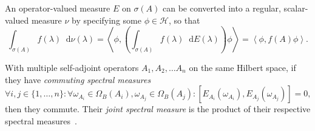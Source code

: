 \documentclass[10pt, a4paper]{article}
\numberwithin{equation}{section} %
\theoremstyle{definition}
\theoremstyle{plain}
\newcommand{\dif}{\mathop{}\!\mathrm{d}} %
\newcommand{\dintv}[2]{\mathopen\{#1,\ldots,#2\mathclose\}}
\newcommand{\?}{\mathrel{?}} %
\newcommand{\angleb}[1]{\left\langle #1 \right\rangle} %
\newcommand{\Hs}{\mathcal{H}} %
\begin{document}
\begin{appendices}
                          An operator-valued measure \(E\) on \(\sigma(A)\) can be converted into a regular, scalar-valued measure \(\nu\) by specifying some \(\phi \in \Hs\), so that
                          \begin{equation} \int_{\sigma(A)} f(\lambda) \dif{\nu(\lambda)} = \angleb{\phi, \left(\int_{\sigma(A)} f(\lambda) \dif{E(\lambda)}\right) \phi} = \angleb{\phi, f(A) \phi}. \end{equation}

                          With multiple self-adjoint operators \(A_1, A_2, \ldots A_n\) on the same Hilbert space, if they have \emph{commuting spectral measures}
                          \begin{equation} \forall i, j \in \dintv{1}{n} : \forall {\omega}_{A_i} \in \Omega_B({A_i}), {\omega}_{A_j} \in \Omega_B({A_j}) : [E_{A_i}({\omega}_{A_i}), E_{A_j}({\omega}_{A_j})] = 0, \end{equation}
                          then they commute. Their \emph{joint spectral measure} is the product of their respective spectral measures~\cite{SpectralTheoryQM}.


\end{appendices}
\end{document}
